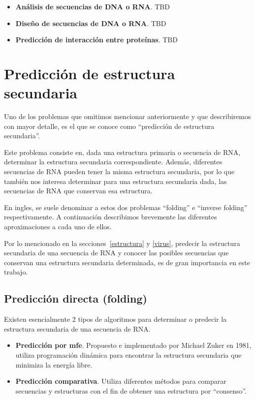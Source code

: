 \begin{itemize}
 \item \textbf{An\'alisis de secuencias de \ac{DNA} o \ac{RNA}}. TBD
 \item \textbf{Dise\~no de secuencias de \ac{DNA} o \ac{RNA}}. TBD
 \item \textbf{Predicci\'on de interacci\'on entre prote\'inas}. TBD
\end{itemize}

\section{Predicci\'on de estructura secundaria}

Uno de los problemas que omitimos mencionar anteriormente y que describiremos
con mayor detalle, es el que se conoce como ``predicci\'on de estructura
secundaria''. 

Este problema consiste en, dada una estructura primaria o secuencia de \ac{RNA},
determinar la estructura secundaria correspondiente. Adem\'as, diferentes
secuencias de \ac{RNA} pueden tener la misma estructura secundaria, por lo que
tambi\'en nos interesa determinar para una estructura secundaria dada, las
secuencias de \ac{RNA} que conservan esa estructura. 

En ingles, se suele denominar a estos dos problemas ``folding'' e
``inverse folding'' respectivamente. A continuaci\'on describimos brevemente las
diferentes aproximaciones a cada uno de ellos.

Por lo mencionado en la secciones~\ref{estructura} y \ref{virus}, predecir la
estructura secundaria de una secuencia de \ac{RNA} y conocer las posibles
secuencias que conservan una estructura secundaria determinada, es de gran
importancia en este trabajo.

\subsection{Predicci\'on directa (folding)}
\label{folding}
Existen esencialmente 2 tipos de algoritmos para determinar o predecir la
estructura secundaria de una secuencia de \ac{RNA}.

\begin{itemize} 
 \item \textbf{Predicci\'on por \ac{mfe}}. Propuesto e implementado por Michael
Zuker en 1981\cite{Zuker81}, utiliza programaci\'on din\'amica para encontrar la
estructura secundaria que minimiza la energ\'ia libre.
 \item \textbf{Predicci\'on comparativa}. Utiliza diferentes m\'etodos para
comparar secuencias y estructuras con el fin de obtener una estructura por
``consenso''\cite{Gardner04}.
\end{itemize}

